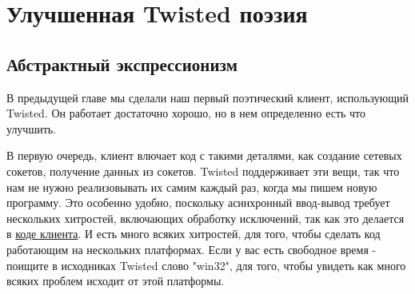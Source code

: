 
\section{Улучшенная Twisted поэзия\label{sec:part5}}


\subsection{Абстрактный экспрессионизм}


В предыдущей главе мы сделали наш первый поэтический клиент, 
использующий Twisted. Он работает достаточно хорошо, но в нем определенно 
есть что улучшить.




В первую очередь, клиент влючает код с такими деталями, 
как создание сетевых сокетов, получение данных из 
сокетов. Twisted поддерживает эти вещи, так что нам не нужно 
реализовывать их самим каждый раз, когда мы пишем новую программу. 
Это особенно удобно, поскольку асинхронный ввод-вывод 
требует нескольких хитростей, включающих обработку исключений, так как это 
делается в 
\href{http://github.com/jdavisp3/twisted-intro/blob/master/twisted-client-1/get-poetry.py}{коде клиента}. 
И есть много всяких хитростей, для того, чтобы сделать код 
работающим на нескольких платформах. Если у вас есть свободное 
время - поищите в исходниках Twisted слово "win32", для того, чтобы 
увидеть как много всяких проблем исходит от этой платформы.




